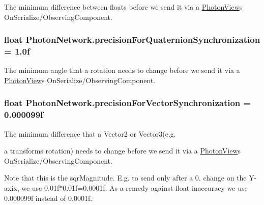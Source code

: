 The minimum difference between floats before we send it via a \hyperlink{class_photon_view}{Photon\+View}\textquotesingle{}s On\+Serialize/\+Observing\+Component. 

\subsubsection[{\texorpdfstring{precision\+For\+Quaternion\+Synchronization}{precisionForQuaternionSynchronization}}]{\setlength{\rightskip}{0pt plus 5cm}float Photon\+Network.\+precision\+For\+Quaternion\+Synchronization = 1.\+0f\hspace{0.3cm}{\ttfamily [static]}}\hypertarget{class_photon_network_a65cc14cdfda9c9cb8dad3b3f862097d4}{}\label{class_photon_network_a65cc14cdfda9c9cb8dad3b3f862097d4}


The minimum angle that a rotation needs to change before we send it via a \hyperlink{class_photon_view}{Photon\+View}\textquotesingle{}s On\+Serialize/\+Observing\+Component. 

\subsubsection[{\texorpdfstring{precision\+For\+Vector\+Synchronization}{precisionForVectorSynchronization}}]{\setlength{\rightskip}{0pt plus 5cm}float Photon\+Network.\+precision\+For\+Vector\+Synchronization = 0.\+000099f\hspace{0.3cm}{\ttfamily [static]}}\hypertarget{class_photon_network_acff20b8fd3871e0b3be350e0d1c98605}{}\label{class_photon_network_acff20b8fd3871e0b3be350e0d1c98605}


The minimum difference that a Vector2 or Vector3(e.\+g. 

a transforms rotation) needs to change before we send it via a \hyperlink{class_photon_view}{Photon\+View}\textquotesingle{}s On\+Serialize/\+Observing\+Component. 

Note that this is the sqr\+Magnitude. E.\+g. to send only after a 0. change on the Y-\/axix, we use 0.\+01f$\ast$0.01f=0.\+0001f. As a remedy against float inaccuracy we use 0.\+000099f instead of 0.\+0001f. 
